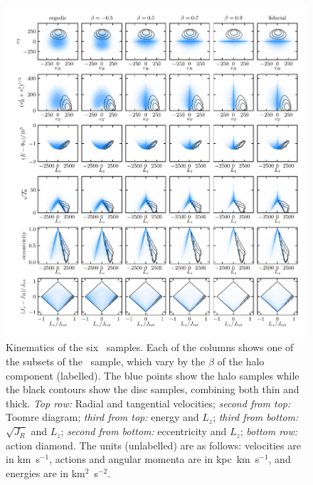 \begin{figure}
	\centering
	\includegraphics[width=\textwidth]{figure/ch2/SolarKinematicsGrid.pdf}
	\caption{Kinematics of the six \solar\ samples. Each of the columns shows one of the subsets of the \solar\ sample, which vary by the $\beta$ of the halo component (labelled). The blue points show the halo samples while the black contours show the disc samples, combining both thin and thick. \textit{Top row:} Radial and tangential velocities; \textit{second from top:} Toomre diagram; \textit{third from top:} energy and $L_{z}$; \textit{third from bottom:} $\sqrt{J_{R}}$ and $L_{z}$; \textit{second from bottom:} eccentricity and $L_{z}$; \textit{bottom row:} action diamond. The units (unlabelled) are as follows: velocities are in km~s$^{-1}$, actions and angular momenta are in kpc~km~s$^{-1}$, and energies are in km$^{2}$~s$^{-2}$.} \label{fig:SolarKinematics}
\end{figure}

